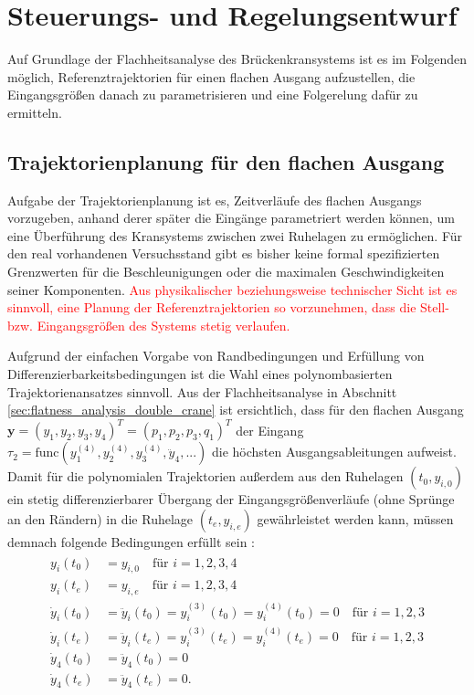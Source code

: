\chapter{Steuerungs- und Regelungsentwurf}
Auf Grundlage der Flachheitsanalyse des Brückenkransystems ist es im Folgenden möglich, Referenztrajektorien für einen flachen Ausgang aufzustellen, die Eingangsgrößen danach zu parametrisieren und eine Folgerelung dafür zu ermitteln. 

\section{Trajektorienplanung für den flachen Ausgang}
\label{sec:trajectory_flat_output}
Aufgabe der Trajektorienplanung ist es, Zeitverläufe des flachen Ausgangs vorzugeben, anhand derer später die Eingänge parametriert werden können, um eine Überführung des Kransystems zwischen zwei Ruhelagen zu ermöglichen. Für den real vorhandenen Versuchsstand gibt es bisher keine formal spezifizierten Grenzwerten für die Beschleunigungen oder die maximalen Geschwindigkeiten seiner Komponenten. \textcolor{red}{Aus physikalischer beziehungsweise technischer Sicht ist es sinnvoll, eine Planung der Referenztrajektorien so vorzunehmen, dass die Stell- bzw. Eingangsgrößen des Systems stetig verlaufen.}

Aufgrund der einfachen Vorgabe von Randbedingungen und Erfüllung von Differenzierbarkeitsbedingungen ist die Wahl eines polynombasierten Trajektorienansatzes sinnvoll. Aus der Flachheitsanalyse in Abschnitt \ref{sec:flatness_analysis_double_crane} ist ersichtlich, dass für den flachen Ausgang ${\mathbf{y} = (y_1, y_2, y_3, y_4)^T = (p_1, p_2, p_3, q_1)^T}$ der Eingang $\tau_2 = \mathrm{func}(y_1^{(4)}, y_2^{(4)}, y_3^{(4)}, \ddot{y}_4, ...)$ die höchsten Ausgangsableitungen aufweist. Damit für die polynomialen Trajektorien außerdem aus den Ruhelagen $(t_0, y_{i, 0})$  ein stetig differenzierbarer Übergang der Eingangsgrößenverläufe (ohne Sprünge an den Rändern) in die Ruhelage $(t_e, y_{i, e})$ gewährleistet werden kann, müssen demnach folgende Bedingungen erfüllt sein \cite[S. 230]{NLRT_Roebenack}:
\begin{align}
	\begin{split}
	y_i(t_0) &= y_{i, 0}  \quad \text{für } i = 1,2,3,4 \\
	y_i(t_e) &= y_{i, e}  \quad \text{für } i = 1,2,3,4 \\
	\dot{y}_i(t_0) &= \ddot{y}_i(t_0) = y_i^{(3)}(t_0) = y_i^{(4)}(t_0) = 0 \quad \text{für } i = 1,2,3 \\
	\dot{y}_i(t_e) &= \ddot{y}_i(t_e) = y_i^{(3)}(t_e) = y_i^{(4)}(t_e) = 0 \quad \text{für } i = 1,2,3 \\
	\dot{y}_4(t_0) &= \ddot{y}_4(t_0) = 0 \\
	\dot{y}_4(t_e) &= \ddot{y}_4(t_e) = 0.
	\end{split}
\end{align}


